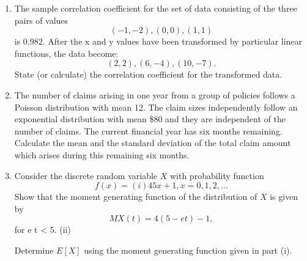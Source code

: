 \documentclass[a4paper,12pt]{article}
\begin{document}
\begin{enumerate}
\item The sample correlation coefficient for the set of data consisting of the three pairs of
values
\[(−1,−2) , (0,0) , (1,1)\]
is 0.982. After the x and y values have been transformed by particular linear functions,
the data become:
\[(2,2) , (6,−4) , (10,−7).\]
State (or calculate) the correlation coefficient for the transformed data.
\item 
The number of claims arising in one year from a group of policies follows a Poisson
distribution with mean 12. The claim sizes independently follow an exponential distribution with mean \$80 and they are independent of the number of claims. The current financial year has six months remaining.
Calculate the mean and the standard deviation of the total claim amount which arises during this remaining six months.


\item

Consider the discrete random variable $X$ with probability function
\[f ( x ) =
(i)
4
5 x + 1
,
x = 0, 1, 2, ...\]
Show that the moment generating function of the distribution of $X$ is given by
\[M X ( t ) = 4(5 − e t ) − 1 ,\]
for e t < 5.
(ii)

Determine $E[X]$ using the moment generating function given in part (i).
\end{enumerate}
\newpage
\end{document}
